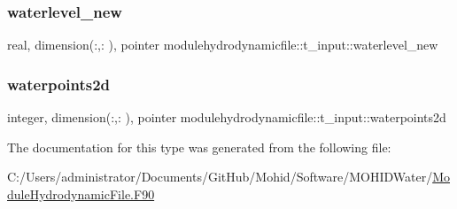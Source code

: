 \subsubsection{\texorpdfstring{waterlevel\+\_\+new}{waterlevel\_new}}
{\footnotesize\ttfamily real, dimension(\+:,\+:  ), pointer modulehydrodynamicfile\+::t\+\_\+input\+::waterlevel\+\_\+new\hspace{0.3cm}{\ttfamily [private]}}

\mbox{\label{structmodulehydrodynamicfile_1_1t__input_ab3582b36e4ed282fc898a352eaccebca}} 
\subsubsection{\texorpdfstring{waterpoints2d}{waterpoints2d}}
{\footnotesize\ttfamily integer, dimension(\+:,\+:  ), pointer modulehydrodynamicfile\+::t\+\_\+input\+::waterpoints2d\hspace{0.3cm}{\ttfamily [private]}}



The documentation for this type was generated from the following file\+:\begin{DoxyCompactItemize}
\item 
C\+:/\+Users/administrator/\+Documents/\+Git\+Hub/\+Mohid/\+Software/\+M\+O\+H\+I\+D\+Water/\mbox{\hyperlink{_module_hydrodynamic_file_8_f90}{Module\+Hydrodynamic\+File.\+F90}}\end{DoxyCompactItemize}
